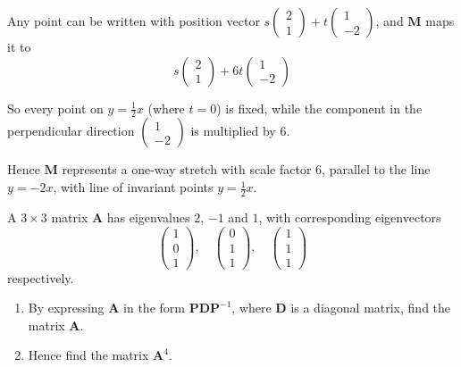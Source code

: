 \documentclass[leqno]{article}
\begin{document}
\begin{enumerate}[
  label=\textbf{\arabic*.},
  leftmargin=*,
  topsep=0pt,
  partopsep=0pt,
  parsep=0pt
]
\begin{djsSolution}
\begin{enumerate}[label=\textbf{(\alph*)}, start=1]
\begin{enumerate}[label=(\roman*), start=1]
Any point can be written with position vector \(s\begin{pmatrix}2\\1\end{pmatrix}+t\begin{pmatrix}1\\-2\end{pmatrix}\), and \(\mathbf{M}\) maps it to
\[
s\begin{pmatrix}2\\1\end{pmatrix}+6t\begin{pmatrix}1\\-2\end{pmatrix}
\]

So every point on \(y=\frac{1}{2}x\) (where \(t=0\)) is fixed, while the component in the perpendicular direction \(\begin{pmatrix}1\\-2\end{pmatrix}\) is multiplied by \(6\).

Hence \(\mathbf{M}\) represents a one-way stretch with scale factor \(6\), parallel to the line \(y=-2x\), with line of invariant points \(y=\frac{1}{2}x\).
  \end{enumerate}
\end{enumerate}
\end{djsSolution}

\newpage

\questionitem

A $3 \times 3$ matrix $\mathbf{A}$ has eigenvalues $2$, $-1$ and $1$, with corresponding eigenvectors
\[\begin{pmatrix} 1 \\ 0 \\ 1 \end{pmatrix}, \quad \begin{pmatrix} 0 \\ 1 \\ 1 \end{pmatrix}, \quad \begin{pmatrix} 1 \\ 1 \\ 1 \end{pmatrix}\]
respectively. \\
\begin{enumerate}[label=\textbf{(\alph*)}]
  \item By expressing $\mathbf{A}$ in the form $\mathbf{P}\mathbf{D}\mathbf{P}^{-1}$, where $\mathbf{D}$ is a diagonal matrix, find the matrix $\mathbf{A}$.  \\
  \item Hence find the matrix $\mathbf{A}^4$.  \\
\end{enumerate}


\end{enumerate}
\end{document}
